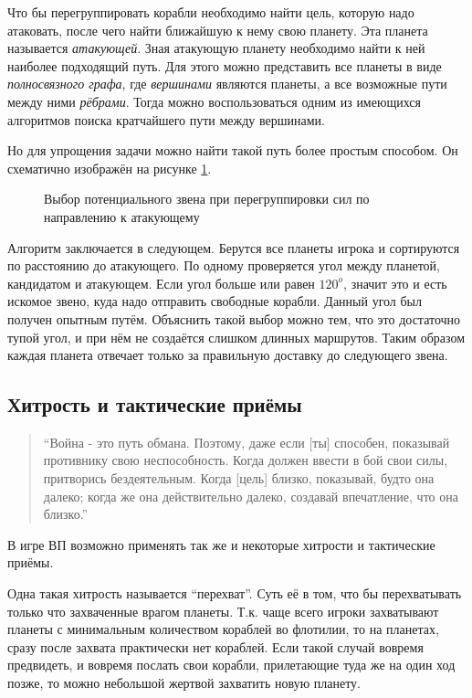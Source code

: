 \documentclass[12pt]{report}
\begin{document}
Что бы перегруппировать корабли необходимо найти цель, которую надо атаковать, после чего найти ближайшую к нему свою планету. Эта планета называется \emph{атакующей}. Зная атакующую планету необходимо найти к ней наиболее подходящий путь. Для этого можно представить все планеты в виде \emph{полносвязного графа}, где \emph{вершинами} являются планеты, а все возможные пути между ними \emph{рёбрами}. Тогда можно воспользоваться одним из имеющихся алгоритмов поиска кратчайшего пути между вершинами. \\ \citep{cormen2001}

Но для упрощения задачи можно найти такой путь более простым способом. Он схематично изображён на рисунке \ref{fig:regrouping}.

\begin{figure}[h]
	\centering
	
	\caption{Выбор потенциального звена при перегруппировки сил по направлению к атакующему}
	\label{fig:regrouping}
\end{figure}

Алгоритм заключается в следующем. Берутся все планеты игрока и сортируются по расстоянию до атакующего. По одному проверяется угол между планетой, кандидатом и атакующем. Если угол больше или равен $120^o$, значит это и есть искомое звено, куда надо отправить свободные корабли. Данный угол был получен опытным путём. Объяснить такой выбор можно тем, что это достаточно тупой угол, и при нём не создаётся слишком длинных маршрутов. Таким образом каждая планета отвечает только за правильную доставку до следующего звена.

\subsection{Хитрость и тактические приёмы}
\label{sec:hints}
\begin{quote}
``Война - это путь обмана. Поэтому, даже если [ты] способен, показывай противнику свою неспособность. Когда должен ввести в бой свои силы, притворись бездеятельным. Когда [цель] близко, показывай, будто она далеко; когда же она действительно далеко, создавай впечатление, что она близко.'' \\ 
\citep{tzu1971art}
\end{quote}

В игре ВП возможно применять так же и некоторые хитрости и тактические приёмы.

Одна такая хитрость называется ``перехват''. Суть её в том, что бы перехватывать только что захваченные врагом планеты. Т.к. чаще всего игроки захватывают планеты с минимальным количеством кораблей во флотилии, то на планетах, сразу после захвата практически нет кораблей. Если такой случай вовремя предвидеть, и вовремя послать свои корабли, прилетающие туда же на один ход позже, то можно небольшой жертвой захватить новую планету.
\end{document}
